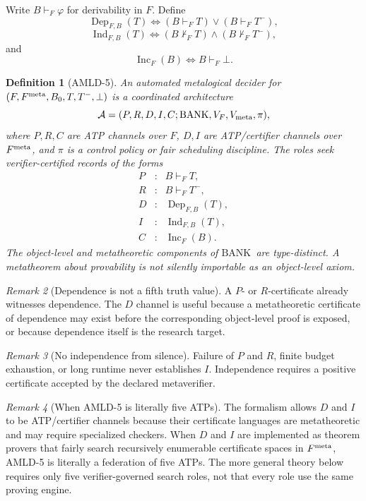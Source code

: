 \documentclass[11pt]{article}
\newtheorem{definition}{Definition}[section]
\theoremstyle{remark}
\newtheorem{remark}[definition]{Remark}
\newcommand{\BANK}{\ensuremath{\mathrm{BANK}}}
\newcommand{\Dep}{\operatorname{Dep}}
\newcommand{\Ind}{\operatorname{Ind}}
\newcommand{\Inc}{\operatorname{Inc}}
\begin{document}
Write $B\vdash_F\varphi$ for derivability in $F$. Define
\[
\Dep_{F,B}(T)\iff (B\vdash_F T)\vee(B\vdash_F T^-),
\]
\[
\Ind_{F,B}(T)\iff (B\nvdash_F T)\wedge(B\nvdash_F T^-),
\]
and
\[
\Inc_F(B)\iff B\vdash_F\bot.
\]

\begin{definition}[AMLD-5]
An automated metalogical decider for $(F,F^{\rm meta},B_0,T,T^-,\bot)$ is a coordinated architecture
\[
\mathcal A=(P,R,D,I,C;\BANK,V_F,V_{\rm meta},\pi),
\]
where $P,R,C$ are ATP channels over $F$, $D,I$ are ATP/certifier channels over $F^{\rm meta}$, and $\pi$ is a control policy or fair scheduling discipline. The roles seek verifier-certified records of the forms
\[
\begin{array}{ccl}
P&:&B\vdash_F T,\\
R&:&B\vdash_F T^-,\\
D&:&\Dep_{F,B}(T),\\
I&:&\Ind_{F,B}(T),\\
C&:&\Inc_F(B).
\end{array}
\]
The object-level and metatheoretic components of \BANK\ are type-distinct. A metatheorem about provability is not silently importable as an object-level axiom.
\end{definition}

\begin{remark}[Dependence is not a fifth truth value]
A $P$- or $R$-certificate already witnesses dependence. The $D$ channel is useful because a metatheoretic certificate of dependence may exist before the corresponding object-level proof is exposed, or because dependence itself is the research target.
\end{remark}

\begin{remark}[No independence from silence]
Failure of $P$ and $R$, finite budget exhaustion, or long runtime never establishes $I$. Independence requires a positive certificate accepted by the declared metaverifier.
\end{remark}

\begin{remark}[When AMLD-5 is literally five ATPs]
The formalism allows $D$ and $I$ to be ATP/certifier channels because their certificate languages are metatheoretic and may require specialized checkers. When $D$ and $I$ are implemented as theorem provers that fairly search recursively enumerable certificate spaces in $F^{\rm meta}$, AMLD-5 is literally a federation of five ATPs. The more general theory below requires only five verifier-governed search roles, not that every role use the same proving engine.
\end{remark}
\end{document}
